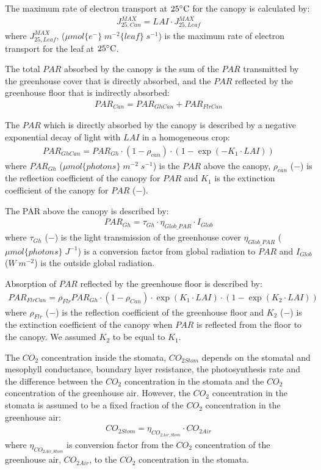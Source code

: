 \documentclass[a4paper]{article}
\begin{document}
The maximum rate of electron transport at \(25 \celsius\) for the canopy is calculated by:
\begin{align}
  J^{MAX}_{25,Can} = LAI \cdot J^{MAX}_{25,Leaf}
\end{align}
where \(J^{MAX}_{25,Leaf}\), (\(\mu mol\{e^-\}\;m^{-2}\{leaf\}\;s^{-1}\)) is the maximum rate of electron transport for the leaf at \(25 \celsius\).

The total \(PAR\) absorbed by the canopy is the sum of the \(PAR\) transmitted by the greenhouse cover that is directly absorbed, and the \(PAR\) reflected by the greenhouse floor that is indirectly absorbed:
\begin{align}
  PAR_{Can} = PAR_{GhCan} + PAR_{FlrCan}
\end{align}

The \(PAR\) which is directly absorbed by the canopy is described by a negative exponential decay of light with \(LAI\) in a homogeneous crop:
\begin{align}
  PAR_{GhCan} = PAR_{Gh}\cdot (1-\rho_{can})\cdot(1 - \exp \left(-K_1\cdot LAI\right))
\end{align}
where \(PAR_{Gh}\) (\(\mu mol \{photons\}\;m^{-2}\;s^{-1}\)) is the \(PAR\) above the canopy, \(\rho_{can}\) (\(-\)) is the reflection coefficient of the canopy for \(PAR\) and \(K_1\) is the extinction coefficient of the canopy for \(PAR\) (\(-\)).

The PAR above the canopy is described by:
\begin{align}
  PAR_{Gh} = \tau_{Gh} \cdot \eta_{Glob\_PAR}\cdot I_{Glob}
\end{align}
where \(\tau_{Gh}\) (\(-\)) is the light transmission of the greenhouse cover \(\eta_{Glob\_PAR}\) (\(\mu mol\{photons\}\;J^{-1}\)) is a conversion factor from global radiation to \(PAR\) and \(I_{Glob}\) (\(W\;m^{-2}\)) is the outside global radiation.

Absorption of \(PAR\) reflected by the greenhouse floor is described by:
\begin{align}
  PAR_{FlrCan} = \rho_{Flr}PAR_{Gh}\cdot (1-\rho_{Can})\cdot \exp \left(K_1\cdot LAI\right) \cdot (1 - \exp \left(K_2\cdot LAI\right))
\end{align}
where \(\rho_{Flr}\) (\(-\)) is the reflection coefficient of the greenhouse floor and \(K_2\) (\(-\)) is the extinction coefficient of the canopy when \(PAR\) is reflected from the floor to the canopy. We assumed \(K_2\) to be equal to \(K_1\).

The \(CO_2\) concentration inside the stomata, \(CO_{2Stom}\) depends on the stomatal and mesophyll conductance, boundary layer resistance, the photosynthesis rate and the difference between the \(CO_2\) concentration in the stomata and the \(CO_2\) concentration of the greenhouse air. However, the \(CO_2\) concentration in the stomata is assumed to be a fixed fraction of the \(CO_2\) concentration in the greenhouse air:
\begin{align}
  CO_{2Stom} = \eta_{CO_{2Air\_Stom}} \cdot CO_{2Air}
\end{align}
where \(\eta_{CO_{2Air\_Stom}}\) is conversion factor from the \(CO_2\) concentration of the greenhouse air, \(CO_{2Air}\), to the \(CO_2\) concentration in the stomata.
\end{document}
